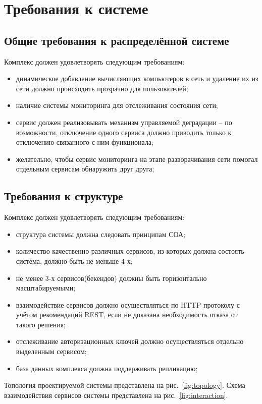 \documentclass[a4paper,12pt]{report}
\numberwithin{equation}{section}
\begin{document}
\section{Требования к системе}
\subsection{Общие требования к распределённой системе}
Комплекс должен удовлетворять следующим требованиям:

\begin{itemize}
  \item динамическое добавление вычисляющих компьютеров в сеть и удаление их из сети должно происходить прозрачно для пользователей;
  \item наличие системы мониторинга для отслеживания состояния сети;
  \item сервис должен реализовывать механизм управляемой деградации -- по возможности, отключение одного сервиса должно приводить только к отключению связанного с ним функционала;
  \item желательно, чтобы сервис мониторинга на этапе разворачивания сети помогал отдельным сервисам обнаружить друг друга;
  
\end{itemize}

\subsection{Требования к структуре}
Комплекс должен удовлетворять следующим требованиям:
\begin{itemize}
  \item структура системы должна следовать принципам СОА;
  \item количество качественно различных сервисов, из которых должна состоять система, должно быть не меньше 4-х;
  \item не менее 3-х сервисов(бекендов) должны быть горизонтально масштабируемыми;
  \item взаимодействие сервисов должно осуществляться по HTTP протоколу с учётом рекомендаций REST, если не доказана необходимость отказа от такого решения;
  \item отслеживание авторизационных ключей должно осуществляться отдельно выделенным сервисом;
  \item база данных комплекса должна поддерживать репликацию; 
\end{itemize}

Топология проектируемой системы представлена на рис.~\ref{fig:topology}.
Схема взаимодействия сервисов системы представлена на рис.~\ref{fig:interaction}.
\end{document}
